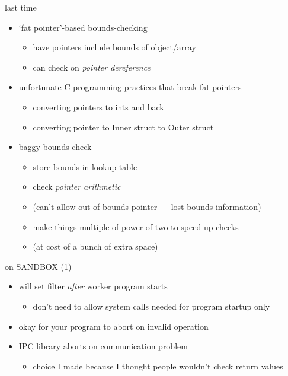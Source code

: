 \date{}
\title{}
\date{}
\usepackage[outputdir=latex.out]{minted}

\begin{frame}
    \titlepage
\end{frame}



\begin{frame}{last time}
    \begin{itemize}
    \item `fat pointer'-based bounds-checking
        \begin{itemize}
        \item have pointers include bounds of object/array
        \item can check on \textit{pointer dereference}
        \end{itemize}
    \item unfortunate C programming practices that break fat pointers
        \begin{itemize}
        \item converting pointers to ints and back
        \item converting pointer to Inner struct to Outer struct
        \end{itemize}
    \item baggy bounds check
        \begin{itemize}
        \item store bounds in lookup table
        \item check \textit{pointer arithmetic}
        \item (can't allow out-of-bounds pointer --- lost bounds information)
        \item make things multiple of power of two to speed up checks
        \item (at cost of a bunch of extra space)
        \end{itemize}
    \end{itemize}
\end{frame}

\begin{frame}{on SANDBOX (1)}
    \begin{itemize}
    \item will set filter \textit{after} worker program starts
        \begin{itemize}
        \item don't need to allow system calls needed for program startup only
        \end{itemize}
    \item okay for your program to abort on invalid operation
    \vspace{.5cm}
    \item IPC library aborts on communication problem
        \begin{itemize}
        \item choice I made because I thought people wouldn't check return values
        \end{itemize}
    \end{itemize}
\end{frame}


